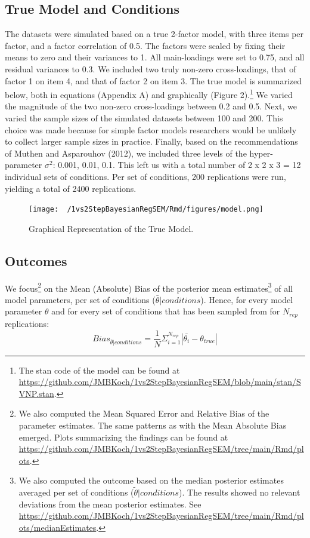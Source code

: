 \documentclass[
  man,floatsintext]{apa6}
\begin{document}
\hypertarget{true-model-and-conditions}{%
\subsection{True Model and Conditions}\label{true-model-and-conditions}}

The datasets were simulated based on a true 2-factor model, with three items per factor, and a factor correlation of 0.5. The factors were scaled by fixing their means to zero and their variances to 1. All main-loadings were set to 0.75, and all residual variances to 0.3. We included two truly non-zero cross-loadings, that of factor 1 on item 4, and that of factor 2 on item 3. The true model is summarized below, both in equations (Appendix A) and graphically (Figure 2).\footnote{The stan code of the model can be found at \url{https://github.com/JMBKoch/1vs2StepBayesianRegSEM/blob/main/stan/SVNP.stan}.} We varied the magnitude of the two non-zero cross-loadings between 0.2 and 0.5. Next, we varied the sample sizes of the simulated datasets between 100 and 200. This choice was made because for simple factor models researchers would be unlikely to collect larger sample sizes in practice. Finally, based on the recommendations of Muthen and Asparouhov (2012), we included three levels of the hyper-parameter \(\sigma^2\): 0.001, 0.01, 0.1. This left us with a total number of 2 x 2 x 3 = 12 individual sets of conditions. Per set of conditions, 200 replications were run, yielding a total of 2400 replications.

\begin{figure}
\centering
\texttt{[image: ~/1vs2StepBayesianRegSEM/Rmd/figures/model.png]}
\caption{Graphical Representation of the True Model.}
\end{figure}

\hypertarget{outcomes}{%
\subsection{Outcomes}\label{outcomes}}

We focus\footnote{We also computed the Mean Squared Error and Relative Bias of the parameter estimates. The same patterns as with the Mean Absolute Bias emerged. Plots summarizing the findings can be found at \url{https://github.com/JMBKoch/1vs2StepBayesianRegSEM/tree/main/Rmd/plots}.} on the Mean (Absolute) Bias of the posterior mean estimates\footnote{We also computed the outcome based on the median posterior estimates averaged per set of conditions (\(\tilde{\theta}|conditions\)). The results showed no relevant deviations from the mean posterior estimates. See \url{https://github.com/JMBKoch/1vs2StepBayesianRegSEM/tree/main/Rmd/plots/medianEstimates}.} of all model parameters, per set of conditions (\(\bar{\theta} | conditions\)). Hence, for every model parameter \(\theta\) and for every set of conditions that has been sampled from for \(N_{rep}\) replications:
\[Bias_{\bar{\theta} | conditions} = \frac{1}{N} \Sigma_{i = 1}^{N_{rep}} |\bar{\theta_i} - \theta_{true}|\]
\end{document}
